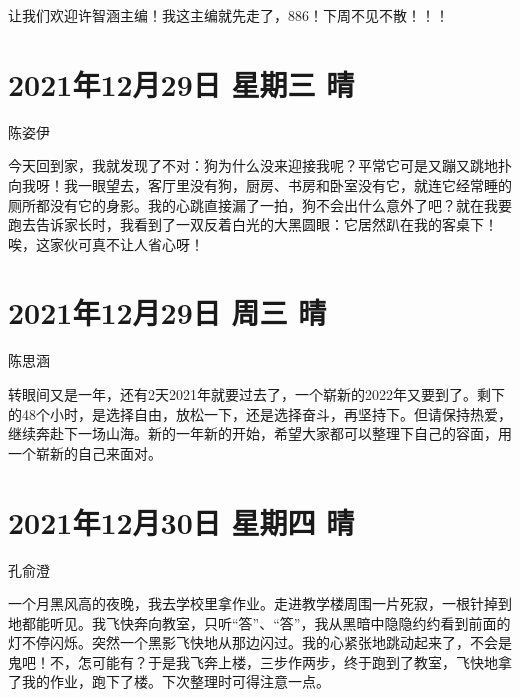 让我们欢迎许智涵主编！我这主编就先走了，886！下周不见不散！！！

\section{2021年12月29日 星期三 晴}

陈姿伊

今天回到家，我就发现了不对：狗为什么没来迎接我呢？平常它可是又蹦又跳地扑向我呀！我一眼望去，客厅里没有狗，厨房、书房和卧室没有它，就连它经常睡的厕所都没有它的身影。我的心跳直接漏了一拍，狗不会出什么意外了吧？就在我要跑去告诉家长时，我看到了一双反着白光的大黑圆眼：它居然趴在我的客桌下！唉，这家伙可真不让人省心呀！

\section{2021年12月29日 周三 晴}

陈思涵

转眼间又是一年，还有2天2021年就要过去了，一个崭新的2022年又要到了。剩下的48个小时，是选择自由，放松一下，还是选择奋斗，再坚持下。但请保持热爱，继续奔赴下一场山海。新的一年新的开始，希望大家都可以整理下自己的容面，用一个崭新的自己来面对。

\section{2021年12月30日 星期四 晴}

孔俞澄

一个月黑风高的夜晚，我去学校里拿作业。走进教学楼周围一片死寂，一根针掉到地都能听见。我飞快奔向教室，只听“答”、“答”，我从黑暗中隐隐约约看到前面的灯不停闪烁。突然一个黑影飞快地从那边闪过。我的心紧张地跳动起来了，不会是鬼吧！不，怎可能有？于是我飞奔上楼，三步作两步，终于跑到了教室，飞快地拿了我的作业，跑下了楼。下次整理时可得注意一点。

